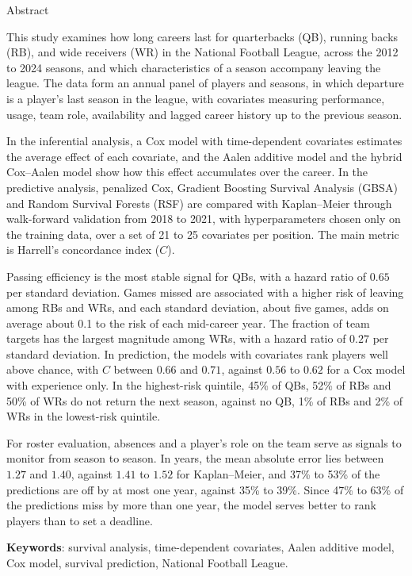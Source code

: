 \clearpage{\thispagestyle{empty}\origcleardoublepage}
\thispagestyle{empty}
\begin{center}
{\LARGE Abstract}
\end{center}
\medskip

This study examines how long careers last for quarterbacks (QB), running backs (RB), and wide receivers (WR) in the National Football League, across the 2012 to 2024 seasons, and which characteristics of a season accompany leaving the league. The data form an annual panel of players and seasons, in which departure is a player's last season in the league, with covariates measuring performance, usage, team role, availability and lagged career history up to the previous season.

In the inferential analysis, a Cox model with time-dependent covariates estimates the average effect of each covariate, and the Aalen additive model and the hybrid Cox--Aalen model show how this effect accumulates over the career. In the predictive analysis, penalized Cox, Gradient Boosting Survival Analysis (GBSA) and Random Survival Forests (RSF) are compared with Kaplan--Meier through walk-forward validation from 2018 to 2021, with hyperparameters chosen only on the training data, over a set of 21 to 25 covariates per position. The main metric is Harrell's concordance index ($C$).

Passing efficiency is the most stable signal for QBs, with a hazard ratio of $0.65$ per standard deviation. Games missed are associated with a higher risk of leaving among RBs and WRs, and each standard deviation, about five games, adds on average about 0.1 to the risk of each mid-career year. The fraction of team targets has the largest magnitude among WRs, with a hazard ratio of $0.27$ per standard deviation. In prediction, the models with covariates rank players well above chance, with $C$ between $0.66$ and $0.71$, against $0.56$ to $0.62$ for a Cox model with experience only. In the highest-risk quintile, 45\% of QBs, 52\% of RBs and 50\% of WRs do not return the next season, against no QB, 1\% of RBs and 2\% of WRs in the lowest-risk quintile.

For roster evaluation, absences and a player's role on the team serve as signals to monitor from season to season. In years, the mean absolute error lies between $1.27$ and $1.40$, against $1.41$ to $1.52$ for Kaplan--Meier, and 37\% to 53\% of the predictions are off by at most one year, against 35\% to 39\%. Since 47\% to 63\% of the predictions miss by more than one year, the model serves better to rank players than to set a deadline.

\medskip
\noindent\textbf{Keywords}: survival analysis, time-dependent covariates, Aalen additive model, Cox model, survival prediction, National Football League.
